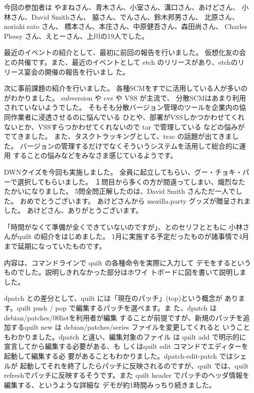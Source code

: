 \documentclass[mingoth,a4paper]{jsarticle}
\begin{document}
今回の参加者は
やまねさん、青木さん、小室さん、溝口さん、あけどさん、
小林さん、David Smithさん、
脇さん、でんさん、鈴木邦男さん、
北原さん、noriaki sato さん、
橋本さん、本庄さん、中原健吾さん、森田尚さん、
Charles Plessy さん、えとーさん、上川の19人でした。


最近のイベントの紹介として、最初に前回の報告を行いました。
仮想化友の会との共催です。また、最近のイベントとして etch 
のリリースがあり、etchのリリース宴会の開催の報告を行いまし
た。


次に事前課題の紹介を行いました。
各種SCMをすでに活用している人が多いのがわかりました。
subversion や cvs や VSS が主流で、
分散SCMはあまり利用されていないようでした。
そもそも分散バージョン管理のツールを企業内の協同作業者に浸透させるのに悩んでいる
ひとや、部署がVSSしかつかわせてくれないとか、VSSすらつかわせてくれないので tar で管理している
などの悩みがでてきました。
また、タスクトラッキングとして、trac の話題が出てきました。
バージョンの管理するだけでなくそういうシステムを活用して総合的に運用
することの悩みなどをみなさま感じているようです。


DWNクイズを今回も実施しました。
全員に起立してもらい、グー・チョキ・パーで選択してもらいました。
１問目から多くの方が間違ってしまい、熾烈なたたかいになりました。
5問全問正解したのは、David Smith さんただ一人でした。
おめでとうございます。
あけどさんから mozilla.party グッズが贈呈されました。
あけどさん、ありがとうございます。


「時間がなくて準備が全くできていないのですが」、とのセリフとともに
小林さんがquilt の紹介をはじめました。
1月に実施する予定だったものが諸事情で4月まで延期になっていたものです。

内容は、コマンドラインで quilt の各種命令を実際に入力して
デモをするというものでした。説明しきれなかった部分はホワイ
トボードに図を書いて説明しました。

dpatch との差分として、quilt には「現在のパッチ」(top)という概念が
あります。quilt push / pop で編集するパッチを選べます。ま
た、dpatch は debian/patches/00listを利用者が編集
することが前提ですが、新規のパッチを追加するquilt new は
debian/patches/series ファイルを変更してくれると
いうこともわかりました。dpatch と違い、編集対象のファイル
は quilt add で明示的に宣言してから編集する必要がある、も
しくはquilt edit コマンドでエディターを起動して編集する必
要があることもわかりました。dpatch-edit-patch ではシェルが
起動してそれを終了したらパッチに反映されるのですが、quilt 
では、quilt refreshでパッチに反映するそうです。また quilt
header でパッチのヘッダ情報を編集する、というような詳細な
デモが約1時間みっちり続きました。
\end{document}
